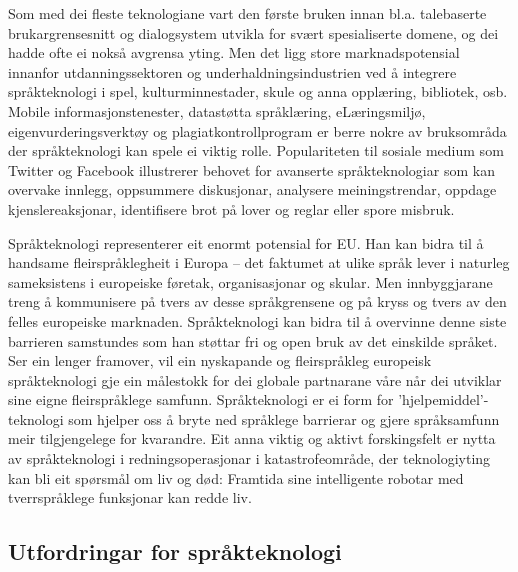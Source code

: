 \begin{multicols}{2}
Som med dei fleste teknologiane vart den første bruken innan bl.a. talebaserte brukargrensesnitt og dialogsystem utvikla for svært spesialiserte domene, og dei hadde ofte ei nokså avgrensa yting. Men det ligg store marknadspotensial innanfor utdanningssektoren og underhaldningsindustrien ved å integrere språkteknologi i spel, kulturminnestader, skule og anna opplæring, bibliotek, osb. Mobile informasjonstenester, datastøtta språklæring, eLæringsmiljø, eigenvurderingsverktøy og plagiatkontrollprogram er berre nokre av bruksområda der språkteknologi kan spele ei viktig rolle. Populariteten til sosiale medium som Twitter og Facebook illustrerer behovet for avanserte språkteknologiar som kan overvake innlegg, oppsummere diskusjonar, analysere meiningstrendar, oppdage kjenslereaksjonar, identifisere brot på lover og reglar eller spore misbruk.


Språkteknologi representerer eit enormt potensial for EU. Han kan bidra til å handsame fleirspråklegheit i Europa – det faktumet at ulike språk lever i naturleg sameksistens i europeiske føretak, organisasjonar og skular. Men innbyggjarane treng å kommunisere på tvers av desse språkgrensene og på kryss og tvers av den felles europeiske marknaden. Språkteknologi kan bidra til å overvinne denne siste barrieren samstundes som han støttar fri og open bruk av det einskilde språket. Ser ein lenger framover, vil ein nyskapande og fleirspråkleg europeisk språkteknologi gje ein målestokk for dei globale partnarane våre når dei utviklar sine eigne fleirspråklege samfunn. Språkteknologi er ei form for 'hjelpemiddel'-teknologi som hjelper oss å bryte ned språklege barrierar og gjere språksamfunn meir tilgjengelege for kvarandre. 
Eit anna viktig og aktivt forskingsfelt er nytta av språkteknologi i redningsoperasjonar i katastrofeområde, der teknologiyting kan bli eit spørsmål om liv og død: Framtida sine intelligente robotar med tverrspråklege funksjonar kan redde liv. 
 
\subsection{Utfordringar for språkteknologi}


\end{multicols}
